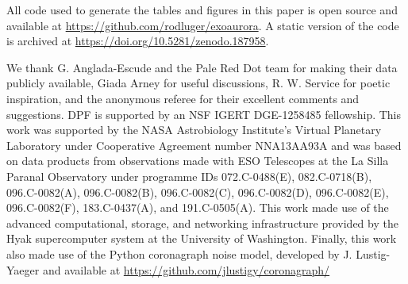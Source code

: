 \documentclass{emulateapj}
\newcommand{\XXX}[1]{#1}      %
\begin{document}
All code used to generate the tables and figures in this paper is open source and available at \url{https://github.com/rodluger/exoaurora}. \XXX{A static version of the code is archived at \url{https://doi.org/10.5281/zenodo.187958}}.\\[0in]

\acknowledgments

We thank G. Anglada-Escude and the Pale Red Dot team for making their data publicly available, Giada Arney for useful discussions, R. W. Service for poetic inspiration, \XXX{and the anonymous referee for their excellent comments and suggestions}. DPF is supported by an NSF IGERT DGE-1258485 fellowship. This work was supported by the NASA Astrobiology Institute's Virtual Planetary Laboratory under Cooperative Agreement number NNA13AA93A and was based on data products from observations made with ESO Telescopes at the La Silla Paranal Observatory under programme IDs 072.C-0488(E), 082.C-0718(B), 096.C-0082(A), 096.C-0082(B), 096.C-0082(C), 096.C-0082(D), 096.C-0082(E), 096.C-0082(F), 183.C-0437(A), and 191.C-0505(A). This work made use of the advanced computational, storage, and networking infrastructure provided by the Hyak supercomputer system at the University of Washington. \XXX{Finally, this work also made use of the Python coronagraph noise model, developed by J. Lustig-Yaeger and available at \url{https://github.com/jlustigy/coronagraph/}}



\end{document}
